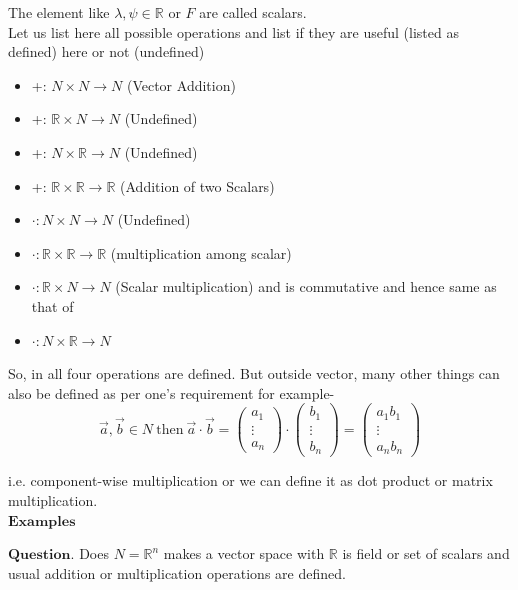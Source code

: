 \documentclass{article}
\begin{document}
The element like $\lambda, \psi \in \mathbb{R}$ or $F$ are called scalars.\\
Let us list here all possible operations and list if they are useful (listed as defined) here or not (undefined)
\begin{itemize}
    \item +: \(N \times N \rightarrow N\) (Vector Addition)
    \item +: \(\mathbb{R} \times N \rightarrow N\) (Undefined) 
    \item +: \(N \times \mathbb{R} \rightarrow N\) (Undefined) 
    \item +: \(\mathbb{R}\times \mathbb{R} \rightarrow \mathbb{R}\) (Addition of two Scalars)
    \item \(\cdot: N \times N \rightarrow N\) (Undefined) 
    \item \(\cdot: \mathbb{R} \times \mathbb{R} \rightarrow \mathbb{R}\) (multiplication among scalar)
    \item \(\cdot: \mathbb{R} \times N \rightarrow N\) (Scalar multiplication) and is commutative and hence same as that of
    \item \(\cdot: N \times \mathbb{R} \rightarrow N\)
\end{itemize}
So, in all four operations are defined. But outside vector, many other things can also be defined as per one's requirement for example-
\[
\vec{a}, \vec{b} \in N ~\text{then}~ \vec{a}\cdot\vec{b} = \begin{pmatrix}a_1 \\ \vdots \\ a_n \end{pmatrix}\cdot \begin{pmatrix}b_1 \\ \vdots \\ b_n \end{pmatrix} = \begin{pmatrix} a_1b_1 \\ \vdots \\ a_nb_n\end{pmatrix}
\]

i.e. component-wise multiplication or we can define it as dot product or matrix multiplication.\\

$\boldsymbol{Examples}$\par
$\boldsymbol{Question}.$ Does $N = \mathbb{R}^n$ makes a vector space with $\mathbb{R}$ is field or set of scalars and usual addition or multiplication operations are defined.\\
\end{document}
